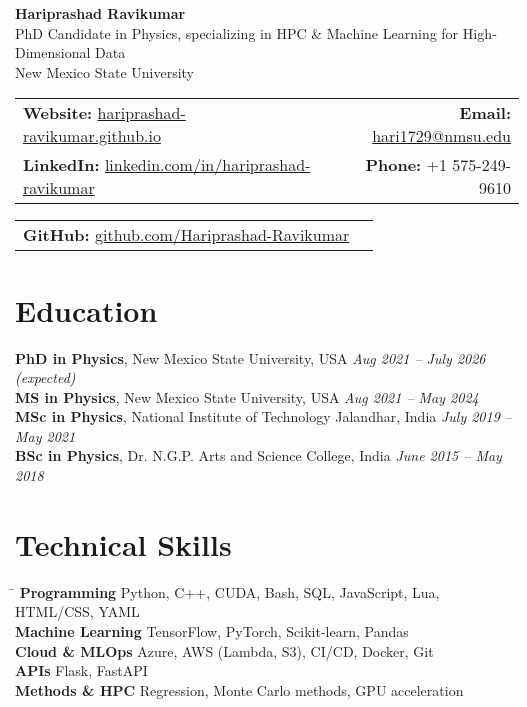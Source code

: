 \documentclass[11pt]{article}
\begin{document}
\begin{center}
  \textbf{\Huge Hariprashad Ravikumar} \\
  \vspace{0.5em}
  PhD Candidate in Physics, specializing in HPC \& Machine Learning for High‐Dimensional Data \\
  New Mexico State University \\
\end{center}

\begin{tabularx}{\textwidth}{@{}Xr@{}}
    \textbf{Website:} \href{https://hariprashad-ravikumar.github.io}{hariprashad-ravikumar.github.io} & \textbf{Email:} \href{mailto:hari1729@nmsu.edu}{hari1729@nmsu.edu}  \\
    \textbf{LinkedIn:} \href{https://www.linkedin.com/in/hariprashad-ravikumar}{linkedin.com/in/hariprashad-ravikumar} & \textbf{Phone:} +1 575-249-9610 
\end{tabularx}
\vspace{-1em}
\begin{tabularx}{\textwidth}{@{}Xr@{}}
\textbf{GitHub:} \href{https://github.com/Hariprashad-Ravikumar}{github.com/Hariprashad-Ravikumar}  \\
\end{tabularx}

\vspace{0.5em}
\section*{Education}
\vspace{0.3em}

\textbf{PhD in Physics}, New Mexico State University, USA \hfill \textit{Aug 2021 – July 2026 (expected)} \\
\textbf{MS in Physics}, New Mexico State University, USA \hfill \textit{Aug 2021 – May 2024} \\
\textbf{MSc in Physics}, National Institute of Technology Jalandhar, India \hfill \textit{July 2019 – May 2021} \\
\textbf{BSc in Physics}, Dr. N.G.P. Arts and Science College, India \hfill \textit{June 2015 – May 2018}



\section*{Technical Skills}
\vspace{-0.3em}
\begin{tabbing}
\hspace{3.5cm} \= \kill
\textbf{Programming} \> Python, C++, CUDA, Bash, SQL, JavaScript, Lua, HTML/CSS, YAML \\
\textbf{Machine Learning} \> TensorFlow, PyTorch, Scikit-learn, Pandas\\
\textbf{Cloud \& MLOps} \> Azure, AWS (Lambda, S3), CI/CD, Docker, Git\\
\textbf{APIs} \> Flask, FastAPI \\
\textbf{Methods \& HPC} \> Regression, Monte Carlo methods, GPU acceleration
\end{tabbing}
\end{document}
